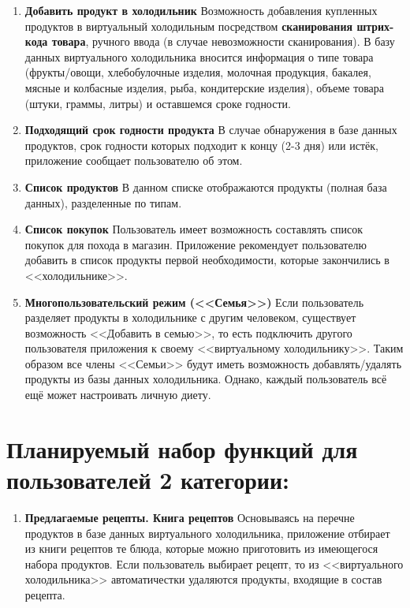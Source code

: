 \documentclass[14pt]{extreport}
\begin{document}
\begin{enumerate}
    \item \textbf{Добавить продукт в холодильник} 
    \newline
    Возможность добавления купленных продуктов в виртуальный холодильным посредством \textbf{сканирования штрих-кода товара}, ручного ввода (в случае невозможности сканирования). В базу данных виртуального холодильника вносится информация о типе товара (фрукты/овощи, хлебобулочные изделия, молочная продукция, бакалея, мясные и колбасные изделия, рыба, кондитерские изделия), объеме товара (штуки, граммы, литры) и оставшемся сроке годности.
    \item \textbf{Подходящий срок годности продукта}
    \newline
    В случае обнаружения в базе данных продуктов, срок годности которых подходит к концу (2-3 дня) или истёк, приложение сообщает пользователю об этом.
    \item \textbf{Список продуктов} 
    \newline
    В данном списке отображаются продукты (полная база данных), разделенные по типам. 
    \item \textbf{Список покупок} 
    \newline
    Пользователь имеет возможность составлять список покупок для похода в магазин. Приложение рекомендует пользователю добавить в список продукты первой необходимости, которые закончились в <<холодильнике>>.
    \item \textbf{Многопользовательский режим (<<Семья>>)} 
    \newline 
    Если пользователь разделяет продукты в холодильнике с другим человеком, существует возможность <<Добавить в семью>>, то есть подключить другого пользователя приложения к своему <<виртуальному холодильнику>>. Таким образом все члены <<Семьи>> будут иметь возможность добавлять/удалять продукты из базы данных холодильника. Однако, каждый пользователь всё ещё может настроивать личную диету.
    
\end{enumerate}
\section {Планируемый набор функций для пользователей 2 категории: }
\begin{enumerate}
    \item \textbf{Предлагаемые рецепты. Книга рецептов} 
    \newline
    Основываясь на перечне продуктов в базе данных виртуального холодильника, приложение отбирает из книги рецептов те блюда, которые можно приготовить из имеющегося набора продуктов. Если пользователь выбирает рецепт, то из <<виртуального холодильника>> автоматичестки удаляются продукты, входящие в состав рецепта.
\end{enumerate}
\end{document}

